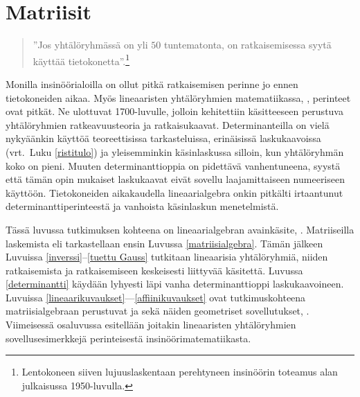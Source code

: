 \chapter{Matriisit} \label{matriisit}

\begin{quote}
''Jos yhtälöryhmässä on yli $50$ tuntematonta, on ratkaisemisessa syytä käyttää
tietokonetta''.\footnote[2]{Lentokoneen siiven lujuuslaskentaan perehtyneen insinöörin toteamus
alan julkaisussa 1950-luvulla.}
\end{quote}

Monilla insinöörialoilla on ollut pitkä  ratkaisemisen perinne
jo ennen tietokoneiden aikaa. Myös lineaaristen yhtälöryhmien matematiikassa,
%
, perinteet ovat pitkät. Ne ulottuvat 1700-luvulle, jolloin kehitettiin
 käsitteeseen perustuva yhtälöryhmien ratkeavuusteoria ja ratkaisukaavat.
Determinanteilla on vielä nykyäänkin käyttöä teoreettisissa tarkasteluissa, erinäisissä
laskukaavoissa (vrt.\ Luku \ref{ristitulo}) ja yleisemminkin käsinlaskussa silloin, kun
yhtälöryhmän koko on pieni. Muuten determinanttioppia on pidettävä vanhentuneena, syystä että
tämän opin mukaiset laskukaavat eivät sovellu laajamittaiseen numeeriseen käyttöön.
Tietokoneiden aikakaudella lineaarialgebra onkin pitkälti irtaantunut determinanttiperinteestä
ja vanhoista käsinlaskun menetelmistä. 

Tässä luvussa tutkimuksen kohteena on lineaarialgebran avainkäsite, .
Matriiseilla laskemista eli  tarkastellaan ensin Luvussa 
\ref{matriisialgebra}. Tämän jälkeen Luvuissa \ref{inverssi}--\ref{tuettu Gauss} tutkitaan 
lineaarisia yhtälöryhmiä, niiden ratkaisemista  ja ratkaisemiseen 
keskeisesti liittyvää  käsitettä. Luvussa \ref{determinantti} käydään
lyhyesti läpi vanha determinanttioppi laskukaavoineen. Luvuissa 
\ref{lineaarikuvaukset}---\ref{affiinikuvaukset} ovat tutkimuskohteena matriisialgebraan 
perustuvat  ja  sekä näiden geometriset 
sovellutukset, . Viimeisessä osaluvussa esitellään joitakin 
lineaaristen yhtälöryhmien sovellusesimerkkejä perinteisestä insinöörimatematiikasta.
